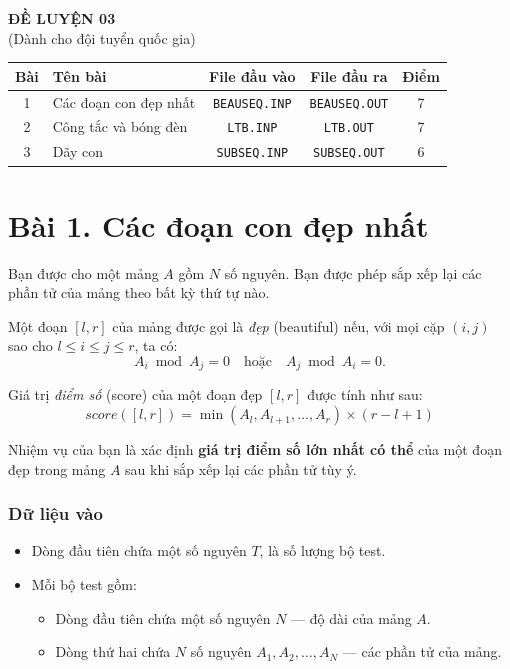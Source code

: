 \begin{center}
    {\LARGE \textbf{ĐỀ LUYỆN 03}}\\[6pt]
    {\large (Dành cho đội tuyển quốc gia)}
\end{center}

\begin{tabularx}{\textwidth}{|c|X|c|c|c|}
\hline
\textbf{Bài} & \textbf{Tên bài} & \textbf{File đầu vào} & \textbf{File đầu ra} & \textbf{Điểm} \\
\hline
1 & Các đoạn con đẹp nhất & \texttt{BEAUSEQ.INP} & \texttt{BEAUSEQ.OUT} & 7 \\
\hline
2 & Công tắc và bóng đèn & \texttt{LTB.INP} & \texttt{LTB.OUT} & 7 \\
\hline
3 & Dãy con & \texttt{SUBSEQ.INP} & \texttt{SUBSEQ.OUT} & 6 \\
\hline
\end{tabularx}


\section*{Bài 1. Các đoạn con đẹp nhất}

Bạn được cho một mảng $A$ gồm $N$ số nguyên. Bạn được phép sắp xếp lại các phần tử của mảng theo bất kỳ thứ tự nào.

Một đoạn $[l, r]$ của mảng được gọi là \textit{đẹp} (beautiful) nếu, với mọi cặp $(i, j)$ sao cho $l \le i \le j \le r$, ta có:
$$
A_i \bmod A_j = 0 \quad \text{hoặc} \quad A_j \bmod A_i = 0.
$$

Giá trị \textit{điểm số} (score) của một đoạn đẹp $[l, r]$ được tính như sau:
$$
score([l,r]) = \min(A_l, A_{l+1}, \ldots, A_r) \times (r - l + 1)
$$

Nhiệm vụ của bạn là xác định \textbf{giá trị điểm số lớn nhất có thể} của một đoạn đẹp trong mảng $A$ sau khi sắp xếp lại các phần tử tùy ý.

\subsubsection*{Dữ liệu vào}

\begin{itemize}
    \item Dòng đầu tiên chứa một số nguyên $T$, là số lượng bộ test.  
    \item Mỗi bộ test gồm:
    \begin{itemize} 
        \item Dòng đầu tiên chứa một số nguyên $N$ — độ dài của mảng $A$.
        \item Dòng thứ hai chứa $N$ số nguyên $A_1, A_2, \ldots, A_N$ — các phần tử của mảng.
    \end{itemize}
\end{itemize}

